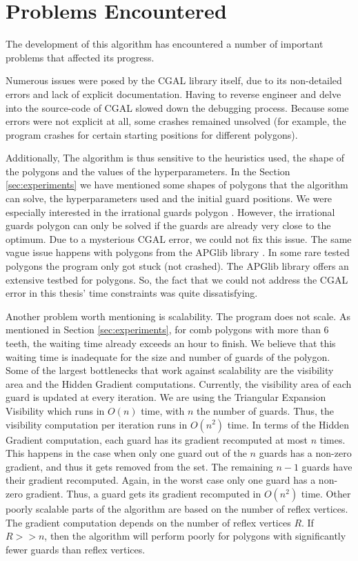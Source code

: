 \section{Problems Encountered}
The development of this algorithm has encountered a number of important problems that affected its progress.

Numerous issues were posed by the CGAL library itself, due to its non-detailed errors and lack of explicit documentation. Having to reverse engineer and delve into the source-code of CGAL slowed down the debugging process. Because some errors were not explicit at all, some crashes remained unsolved (for example, the program crashes for certain starting positions for different polygons).

Additionally, The algorithm is thus sensitive to the heuristics used, the shape of the polygons and the values of the hyperparameters. In the Section \ref{sec:experiments} we have mentioned some shapes of polygons that the algorithm can solve, the hyperparameters used and the initial guard positions.
We were especially interested in the irrational guards polygon \cite{abrahamsen2021art}. However, the irrational guards polygon can only be solved if the guards are already very close to the optimum. Due to a mysterious CGAL error, we could not fix this issue.
The same vague issue happens with polygons from the APGlib library \cite{art-gallery-instances-page}. In some rare tested polygons the program only got stuck (not crashed). The APGlib library offers an extensive testbed for polygons. So, the fact that we could not address the CGAL error in this thesis' time constraints was quite dissatisfying.

Another problem worth mentioning is scalability. The program does not scale. As mentioned in Section \ref{sec:experiments}, for comb polygons with more than 6 teeth, the waiting time already exceeds an hour to finish. We believe that this waiting time is inadequate for the size and number of guards of the polygon.
Some of the largest bottlenecks that work against scalability are the visibility area and the Hidden Gradient computations. Currently, the visibility area of each guard is updated at every iteration. We are using the Triangular Expansion Visibility \cite{DBLP:journals/corr/BungiuHHHK14} which runs in $O(n)$ time, with $n$ the number of guards. Thus, the visibility computation per iteration runs in $O(n^2)$ time. 
In terms of the Hidden Gradient computation, each guard has its gradient recomputed at most $n$ times. This happens in the case when only one guard out of the $n$ guards has a non-zero gradient, and thus it gets removed from the set. The remaining $n - 1$ guards have their gradient recomputed. Again, in the worst case only one guard has a non-zero gradient. Thus, a guard gets its gradient recomputed in $O(n^2)$ time.
Other poorly scalable parts of the algorithm are based on the number of reflex vertices. The gradient computation depends on the number of reflex vertices $R$. If $R >> n$, then the algorithm will perform poorly for polygons with significantly fewer guards than reflex vertices.

